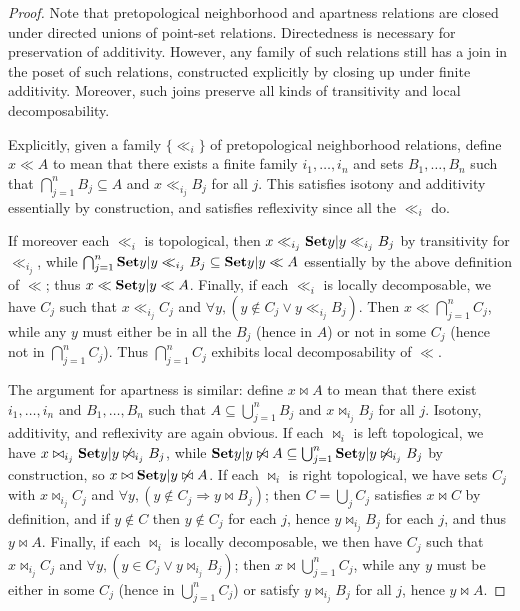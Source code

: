 \documentclass{article}
\def\cpl#1{\neg #1}
\let\implies\Rightarrow
\def\nn{\ensuremath{\neg\neg}}
\begin{document}
\begin{proof}
  Note that pretopological neighborhood and apartness relations are closed under directed unions of point-set relations.
  Directedness is necessary for preservation of additivity.
  However, any family of such relations still has a join in the poset of such relations, constructed explicitly by closing up under finite additivity.
  Moreover, such joins preserve all kinds of transitivity %
  and local decomposability.

  Explicitly, given a family $\{\ll_i\}$ of pretopological neighborhood relations, define $x\ll A$ to mean that there exists a finite family $i_1,\dots,i_n$ and sets $B_1,\dots, B_n$ such that $\bigcap_{j=1}^n B_j \subseteq A$ and $x\ll_{i_j} B_j$ for all $j$.
  This satisfies isotony and additivity essentially by construction, and satisfies reflexivity since all the $\ll_i$ do.

  If moreover each $\ll_i$ is topological, then $x\ll_{i_j} \setof{y|y\ll_{i_j} B_j}$ by transitivity for $\ll_{i_j}$, while $\bigcap_{j=1}^n \setof{y|y\ll_{i_j} B_j} \subseteq \setof{y|y\ll A}$ essentially by the above definition of $\ll$; thus $x\ll \setof{y|y\ll A}$.
  Finally, if each $\ll_i$ is locally decomposable, we have $C_j$ such that $x\ll_{i_j} C_j$ and $\forall y, (y\notin C_j \lor y\ll_{i_j} B_j)$.
  Then $x \ll \bigcap_{j=1}^n C_j$, while any $y$ must either be in all the $B_j$ (hence in $A$) or not in some $C_j$ (hence not in $\bigcap_{j=1}^n C_j$).
  Thus $\bigcap_{j=1}^n C_j$ exhibits local decomposability of $\ll$.

  The argument for apartness is similar: define $x\bowtie A$ to mean that there exist $i_1,\dots,i_n$ and $B_1,\dots, B_n$ such that $A\subseteq \bigcup_{j=1}^n B_j$ and $x\bowtie_{i_j} B_j$ for all $j$.
  Isotony, additivity, and reflexivity are again obvious.
  If each $\bowtie_i$ is left topological, we have $x\bowtie_{i_j} \setof{y|y\not\bowtie_{i_j} B_j}$, while $\setof{y|y\not\bowtie A} \subseteq \bigcup_{j=1}^n\setof{y|y\not\bowtie_{i_j} B_j}$ by construction, so $x\bowtie \setof{y|y\not\bowtie A}$.
  If each $\bowtie_i$ is right topological, we have sets $C_j$ with $x\bowtie_{i_j} C_j$ and $\forall y, (y\notin C_j \implies y\bowtie B_j)$; then $C = \bigcup_j C_j$ satisfies $x\bowtie C$ by definition, and if $y\notin C$ then $y\notin C_j$ for each $j$, hence $y\bowtie_{i_j} B_j$ for each $j$, and thus $y\bowtie A$.
  Finally, if each $\bowtie_i$ is locally decomposable, we then have $C_j$ such that $x\bowtie_{i_j} C_j$ and $\forall y, (y\in C_j \lor y\bowtie_{i_j} B_j)$; then $x\bowtie \bigcup_{j=1}^n C_j$, while any $y$ must be either in some $C_j$ (hence in $\bigcup_{j=1}^n C_j$) or satisfy $y\bowtie_{i_j} B_j$ for all $j$, hence $y\bowtie A$.


\end{proof}
\end{document}
